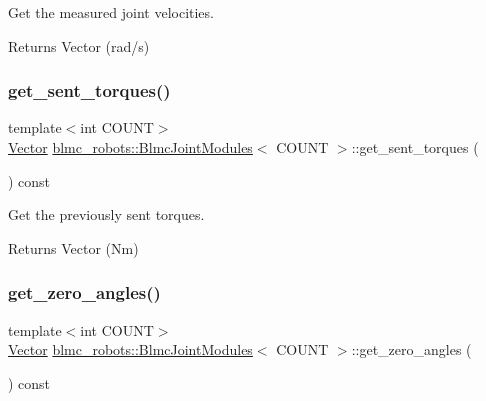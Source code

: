 Get the measured joint velocities. 

\begin{DoxyReturn}{Returns}
Vector (rad/s) 
\end{DoxyReturn}
\mbox{\label{classblmc__robots_1_1BlmcJointModules_a92f207c6fe5f8fd341b31ef15669fb83}} 
\subsubsection{\texorpdfstring{get\+\_\+sent\+\_\+torques()}{get\_sent\_torques()}}
{\footnotesize\ttfamily template$<$int C\+O\+U\+NT$>$ \\
\hyperlink{classblmc__robots_1_1BlmcJointModules_abaff382c6fd4b494ec0c17498d94919e}{Vector} \hyperlink{classblmc__robots_1_1BlmcJointModules}{blmc\+\_\+robots\+::\+Blmc\+Joint\+Modules}$<$ C\+O\+U\+NT $>$\+::get\+\_\+sent\+\_\+torques (\begin{DoxyParamCaption}{ }\end{DoxyParamCaption}) const\hspace{0.3cm}{\ttfamily [inline]}}



Get the previously sent torques. 

\begin{DoxyReturn}{Returns}
Vector (Nm) 
\end{DoxyReturn}
\mbox{\label{classblmc__robots_1_1BlmcJointModules_a443404bd864cd2d552e92238a385061a}} 
\subsubsection{\texorpdfstring{get\+\_\+zero\+\_\+angles()}{get\_zero\_angles()}}
{\footnotesize\ttfamily template$<$int C\+O\+U\+NT$>$ \\
\hyperlink{classblmc__robots_1_1BlmcJointModules_abaff382c6fd4b494ec0c17498d94919e}{Vector} \hyperlink{classblmc__robots_1_1BlmcJointModules}{blmc\+\_\+robots\+::\+Blmc\+Joint\+Modules}$<$ C\+O\+U\+NT $>$\+::get\+\_\+zero\+\_\+angles (\begin{DoxyParamCaption}{ }\end{DoxyParamCaption}) const\hspace{0.3cm}{\ttfamily [inline]}}



